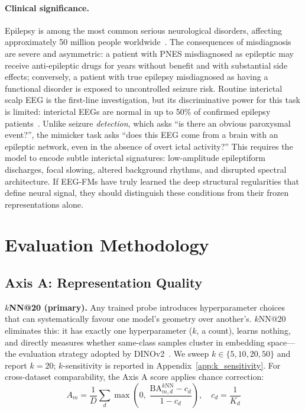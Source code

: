\documentclass{article}
\begin{document}
\paragraph{Clinical significance.}
Epilepsy is among the most common serious neurological disorders, affecting approximately 50 million people worldwide~\citep{who2023epilepsy}. The consequences of misdiagnosis are severe and asymmetric: a patient with PNES misdiagnosed as epileptic may receive anti-epileptic drugs for years without benefit and with substantial side effects; conversely, a patient with true epilepsy misdiagnosed as having a functional disorder is exposed to uncontrolled seizure risk. Routine interictal scalp EEG is the first-line investigation, but its discriminative power for this task is limited: interictal EEGs are normal in up to 50\% of confirmed epilepsy patients~\citep{smith2005eeg}. Unlike seizure \emph{detection}, which asks ``is there an obvious paroxysmal event?'', the mimicker task asks ``does this EEG come from a brain with an epileptic network, even in the absence of overt ictal activity?'' This requires the model to encode subtle interictal signatures: low-amplitude epileptiform discharges, focal slowing, altered background rhythms, and disrupted spectral architecture. If EEG-FMs have truly learned the deep structural regularities that define neural signal, they should distinguish these conditions from their frozen representations alone.

\section{Evaluation Methodology}
\label{sec:methods}

\subsection{Axis A: Representation Quality}
\label{sec:axis_a}

\textbf{$k$NN@20 (primary).} Any trained probe introduces hyperparameter choices that can systematically favour one model's geometry over another's. $k$NN@20 eliminates this: it has exactly one hyperparameter ($k$, a count), learns nothing, and directly measures whether same-class samples cluster in embedding space---the evaluation strategy adopted by DINOv2~\citep{oquab2023dinov2}. We sweep $k \in \{5, 10, 20, 50\}$ and report $k{=}20$; $k$-sensitivity is reported in Appendix~\ref{app:k_sensitivity}. For cross-dataset comparability, the Axis A score applies chance correction:
\begin{equation}
A_m = \frac{1}{D}\sum_d \max\!\left(0,\; \frac{\text{BA}^{k\text{NN}}_{m,d} - c_d}{1 - c_d}\right), \quad c_d = \frac{1}{K_d}
\label{eq:axis_a_score}
\end{equation}
\end{document}
